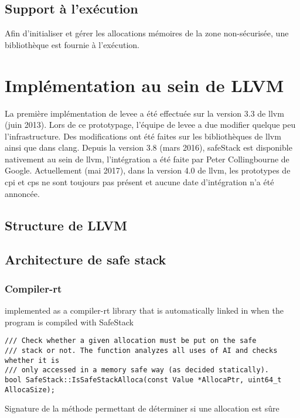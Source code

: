 \subsection{Support à l'exécution}

Afin d'initialiser et gérer les allocations mémoires de la zone non-sécurisée, une bibliothèque est fournie à l'exécution.

\section{Implémentation au sein de LLVM}

%

La première implémentation de \gls{levee} a été effectuée sur la version 3.3 de \gls{llvm} (juin 2013). Lors de ce prototypage, l'équipe de \gls{levee} a due modifier quelque peu l'infrastructure. Des modifications ont été faites sur les bibliothèques de \gls{llvm} ainsi que dans \gls{clang}. Depuis la version 3.8 (mars 2016), \gls{safeStack} est disponible nativement au sein de \gls{llvm}, l'intégration a été faite par Peter Collingbourne de Google. Actuellement (mai 2017), dans la version 4.0 de \gls{llvm}, les prototypes de \gls{cpi} et \gls{cps} ne sont toujours pas présent et aucune date d'intégration n'a été annoncée.

\subsection{Structure de LLVM}


\subsection{Architecture de \og safe stack \fg}


\subsubsection{Compiler-rt}
implemented as a compiler-rt library that is automatically linked in when the program is compiled with SafeStack



\begin{listing}
	\begin{verbatim}
/// Check whether a given allocation must be put on the safe
/// stack or not. The function analyzes all uses of AI and checks whether it is
/// only accessed in a memory safe way (as decided statically).
bool SafeStack::IsSafeStackAlloca(const Value *AllocaPtr, uint64_t AllocaSize);
	\end{verbatim}
	\caption{Signature de la méthode permettant de déterminer si une allocation est sûre}
	\label{lst:IsSafeStackAllocaHeader}
\end{listing}


